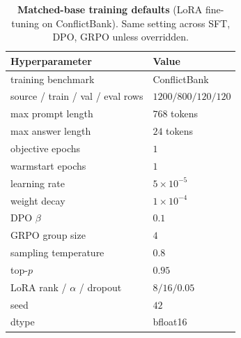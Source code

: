 \begin{table}[H]
\centering\small
\caption{\textbf{Matched-base training defaults} (LoRA fine-tuning on
ConflictBank).  Same setting across SFT, DPO, GRPO unless overridden.}
\label{tab:matched-base-defaults}
\setlength{\tabcolsep}{6pt}
\begin{tabular}{ll}
\toprule
\textbf{Hyperparameter} & \textbf{Value}\\
\midrule
training benchmark              & ConflictBank \\
source / train / val / eval rows & $1200 / 800 / 120 / 120$ \\
max prompt length               & $768$ tokens \\
max answer length               & $24$ tokens \\
objective epochs                & $1$ \\
warmstart epochs                & $1$ \\
learning rate                   & $5\!\times\!10^{-5}$ \\
weight decay                    & $1\!\times\!10^{-4}$ \\
DPO $\beta$                     & $0.1$ \\
GRPO group size                 & $4$ \\
sampling temperature            & $0.8$ \\
top-$p$                         & $0.95$ \\
LoRA rank / $\alpha$ / dropout  & $8 / 16 / 0.05$ \\
seed                            & $42$ \\
dtype                           & bfloat16 \\
\bottomrule
\end{tabular}
\end{table}

